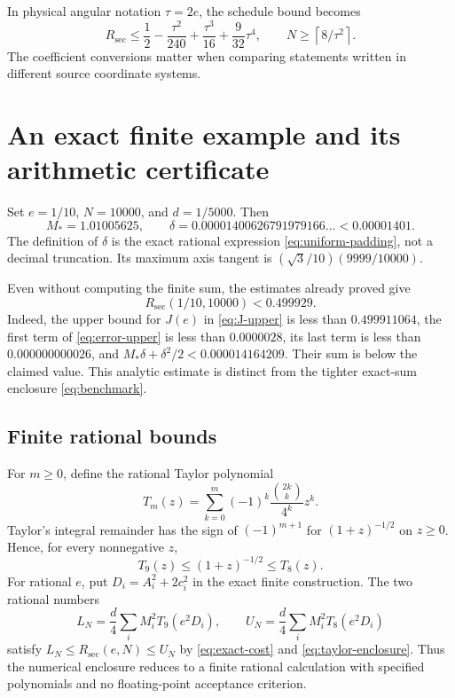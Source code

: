 \documentclass[11pt]{amsart}
\theoremstyle{definition}
\theoremstyle{remark}
\newcommand{\ceil}[1]{\left\lceil#1\right\rceil}
\newcommand{\Rsec}{R_{\mathrm{sec}}}
\begin{document}
In physical angular notation $\tau=2e$, the schedule bound becomes
\[
 \Rsec\le\frac12-\frac{\tau^2}{240}
                   +\frac{\tau^3}{16}+\frac9{32}\tau^4,
 \qquad N\ge\ceil{8/\tau^2}.
\]
The coefficient conversions matter when comparing statements written in
different source coordinate systems.

\section{An exact finite example and its arithmetic certificate}
\label{sec:certificate}

Set $e=1/10$, $N=10000$, and $d=1/5000$. Then
\[
 M_*=1.01005625,\qquad
 \delta=0.00001400626791979166\ldots<0.00001401.
\]
The definition of $\delta$ is the exact rational expression
\eqref{eq:uniform-padding}, not a decimal truncation. Its maximum axis
tangent is $(\sqrt3/10)(9999/10000)$.

Even without computing the finite sum, the estimates already proved give
\begin{equation}\label{eq:analytic-benchmark}
 \Rsec(1/10,10000)<0.499929.
\end{equation}
Indeed, the upper bound for $J(e)$ in \eqref{eq:J-upper} is less than
$0.499911064$, the first term of \eqref{eq:error-upper} is less than
$0.0000028$, its last term is less than $0.000000000026$, and
$M_*\delta+\delta^2/2<0.000014164209$. Their sum is below the
claimed value. This analytic estimate is distinct from the tighter
exact-sum enclosure \eqref{eq:benchmark}.

\subsection{Finite rational bounds}
For $m\ge0$, define the rational Taylor polynomial
\[
 T_m(z)=\sum_{k=0}^m(-1)^k\frac{\binom{2k}{k}}{4^k}z^k.
\]
Taylor's integral remainder has the sign of $(-1)^{m+1}$ for
$(1+z)^{-1/2}$ on $z\ge0$. Hence, for every nonnegative $z$,
\begin{equation}\label{eq:taylor-enclosure}
 T_9(z)\le(1+z)^{-1/2}\le T_8(z).
\end{equation}
For rational $e$, put $D_i=A_i^2+2c_i^2$ in the exact finite
construction. The two rational numbers
\begin{equation}\label{eq:rational-certificate}
 L_N=\frac d4\sum_i M_i^2T_9(e^2D_i),\qquad
 U_N=\frac d4\sum_i M_i^2T_8(e^2D_i)
\end{equation}
satisfy $L_N\le\Rsec(e,N)\le U_N$ by
\eqref{eq:exact-cost} and \eqref{eq:taylor-enclosure}.
Thus the numerical enclosure reduces to a finite rational calculation
with specified polynomials and no floating-point acceptance criterion.
\end{document}
